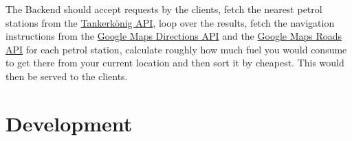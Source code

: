 \documentclass{article}
\begin{document}
The Backend should accept requests by the clients, fetch the nearest petrol stations from the \href{https://creativecommons.tankerkoenig.de/}{Tankerkönig API}, loop over the results, fetch the navigation instructions from the \href{https://developers.google.com/maps/documentation/directions/start}{Google Maps Directions API} and the \href{https://developers.google.com/maps/documentation/roads/overview}{Google Maps Roads API} 
 for each petrol station, calculate roughly how much fuel you would consume to get there from your current location and then sort it by cheapest. This would then be served to the clients. 

\section{Development}
\end{document}
